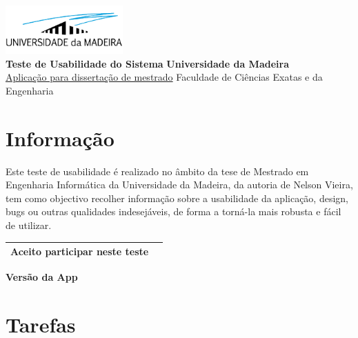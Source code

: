 \documentclass[12pt,a4paper]{article}
\date{}
\begin{document}
\noindent
\hfill \includegraphics[width=4.5cm]{assets/images/uma_logo.png} \\
\large
\textbf{Teste de Usabilidade do Sistema} \hfill \textbf{Universidade da Madeira} \\
\normalsize
\hyperlink{https://github.com/nelson-vieira/masters-thesis/tree/master/masters-thesis/app}{Aplicação para dissertação de mestrado} \hfill Faculdade de Ciências Exatas e da Engenharia \\

\section*{Informação}

Este teste de usabilidade é realizado no âmbito da tese de Mestrado em Engenharia
Informática da Universidade da Madeira, da autoria de Nelson Vieira, tem como
objectivo recolher informação sobre a usabilidade da aplicação, design, bugs ou
outras qualidades indesejáveis, de forma a torná-la mais robusta e fácil de utilizar.

\vspace{1cm}

\begin{tabular}{|m{10cm}|m{1cm}|}
    \hline
    Aceito participar neste teste & \\
    \hline
\end{tabular}

\vspace{1cm}

\textbf{Versão da App}

\clearpage

\section*{Tarefas}
\end{document}
